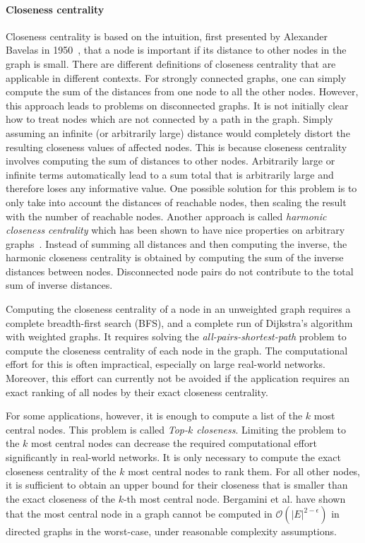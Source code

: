 \paragraph{Closeness centrality}
Closeness centrality is based on the intuition, first presented by Alexander Bavelas in 1950~\cite{bavelas1950communication}, that a node is important if its distance to other nodes in the graph is small. There are different definitions of closeness centrality that are applicable in different contexts. For strongly connected graphs, one can simply compute the sum of the distances from one node to all the other nodes. However, this approach leads to problems on disconnected graphs. It is not initially clear how to treat nodes which are not connected by a path in the graph. Simply assuming an infinite (or arbitrarily large) distance would completely distort the resulting closeness values of affected nodes. This is because closeness centrality involves computing the sum of distances to other nodes. Arbitrarily large or infinite terms automatically lead to a sum total that is arbitrarily large and therefore loses any informative value. One possible solution for this problem is to only take into account the distances of reachable nodes, then scaling the result with the number of reachable nodes. Another approach is called \emph{harmonic closeness centrality} which has been shown to have nice properties on arbitrary graphs~\cite{boldi2014axioms}. Instead of summing all distances and then computing the inverse, the harmonic closeness centrality is obtained by computing the sum of the inverse distances between nodes. Disconnected node pairs do not contribute to the total sum of inverse distances.

Computing the closeness centrality of a node in an unweighted graph requires a complete breadth-first search (BFS), and a complete run of Dijkstra's algorithm~\cite{dijkstra1959note} with weighted graphs. It requires solving the \emph{all-pairs-shortest-path} problem to compute the closeness centrality of each node in the graph. The computational effort for this is often impractical, especially on large real-world networks. Moreover, this effort can currently not be avoided if the application requires an exact ranking of all nodes by their exact closeness centrality.

For some applications, however, it is enough to compute a list of the $k$ most central nodes. This problem is called \emph{Top-$k$ closeness}. Limiting the problem to the $k$ most central nodes can decrease the required computational effort significantly in real-world networks. It is only necessary to compute the exact closeness centrality of the $k$ most central nodes to rank them. For all other nodes, it is sufficient to obtain an upper bound for their closeness that is smaller than the exact closeness of the $k$-th most central node. Bergamini et al. have shown that the most central node in a graph cannot be computed in $\mathcal{O}(|E|^{2 - \epsilon})$ in directed graphs in the worst-case, under reasonable complexity assumptions. 

